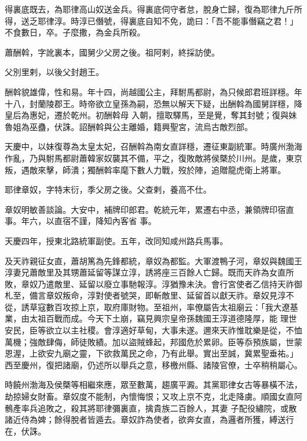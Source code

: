 \begin{pinyinscope}
 得裏底既去，為耶律高山奴送金兵。得裏底伺守者怠，脫身亡歸，復為耶律九斤所得，送乏耶律淳。時淳已僭號，得裏底自知不免，詭曰：「吾不能事僭竊之君！」不食數日，卒。子麼撒，為金兵所殺。



 蕭酬斡，字訛裏本，國舅少父房之後。祖阿剌，終採訪使。



 父別里剌，以後父封趙王。



 酬斡貌雄偉，性和易。年十四，尚越國公主，拜駙馬都尉，為只候郎君班詳穩。年十八，封蘭陵郡王。時帝欲立皇孫為嗣，恐無以解天下疑，出酬斡為國舅詳穩，降皇后為惠妃，遷於乾州。初酬斡母
 入朝，擅取驛馬，至是覺，奪其封號；復與妹魯姐為巫蠱，伏誅。詔酬斡與公主離婚，籍興聖宮，流烏古敵烈部。



 天慶中，以妹復尊為太皇太妃，召酬斡為南女直詳穩，遷征東副統軍。時廣州渤海作亂，乃與駙馬都尉蕭韓家奴襲其不備，平之，復敗敵將侯槩於川州。是歲，東京叛，遇敵來擊，師潰；獨酬斡率麾下數人力戰，歿於陣，追贈龍虎衛上將軍。



 耶律章奴，字特末衍，季父房之後。父查剌，養高不仕。



 章奴明敏善談論。大安中，補牌印郎君。乾統元年，累遷右中丞，兼領牌印宿直事。年六，以直宿不謹，降知內客省
 事。



 天慶四年，授東北路統軍副使。五年，改同知咸州路兵馬事。



 及天祚親征女直，蕭胡篤為先鋒都統，章奴為都監。大軍渡鴨子河，章奴與魏國王淳妻兄蕭敵里及其甥蕭延留等謀立淳，誘將座三百餘人亡歸。既而天祚為女直所敗，章奴乃遣敵里、延留以廢立事馳報淳。淳猶豫未決。會行宮使者乙信持天祚御札至，備言章奴叛命，淳對使者號哭，即斬敵里、延留首以獻天祚。章奴見淳不從，誘草寇數百攻掠上京，取府庫財物。至祖州，率僚屬告太祖廟云：「我大遼基業，由太祖百戰而成。今天下土崩，竊見興宗皇帝孫魏國王淳道德隆厚，能
 理世安民，臣等欲立以主社稷。會淳適好草甸，大事未遂。邇來天祚惟耽樂是從，不恤萬機；強敵肆侮，師徒敗績。加以盜賊蜂起，邦國危於累卵。臣等忝預族屬，世蒙恩渥，上欲安九廟之靈，下欲救萬民之命，乃有此舉。實出至誠，冀累聖垂祐。」西至慶州，復把諸廟，仍述所以舉兵之意，移檄州縣、諸陵官僚，士卒稍稍屬心。



 時饒州渤海及侯槩等相繼來應，眾至數萬，趨廣平澱。其黨耶律女古等暴橫不法，劫掠婦女財畜。章奴度不能制，內懷悔恨；又攻上京不克，北走降虜。順國女直阿鶻產率兵追敗之，殺其將耶律彌裏直，擒貴族二百餘人，其妻
 子配役繡院，或散諸近侍為婢；餘得脫者皆遁去。章奴詐為使者，欲奔女直，為邏者所獲，縛送行在，伏誅。




\end{pinyinscope}
